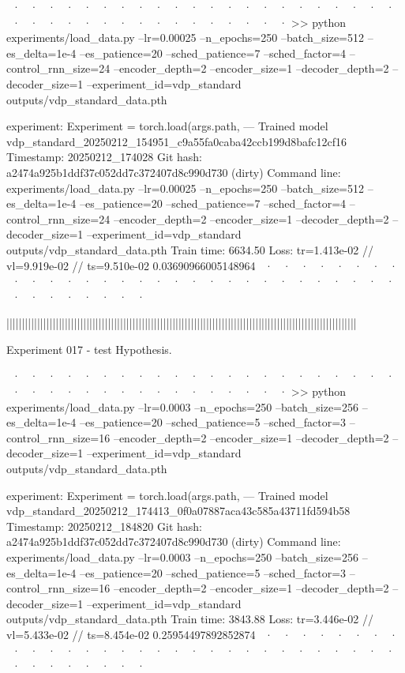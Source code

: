~· ~· ~· ~· ~· ~· ~· ~· ~· ~· ~· ~· ~· ~· ~· ~· ~· ~· ~· ~· ~· ~· ~· ~· ~· ~· ~· ~· ~· ~· ~· ~· ~· ~· ~· ~· ~· ~· 
>> python experiments/load_data.py --lr=0.00025 --n_epochs=250 --batch_size=512 --es_delta=1e-4 --es_patience=20 --sched_patience=7 --sched_factor=4 --control_rnn_size=24 --encoder_depth=2 --encoder_size=1 --decoder_depth=2 --decoder_size=1 --experiment_id=vdp_standard outputs/vdp_standard_data.pth

experiment: Experiment = torch.load(args.path,
--- Trained model   vdp_standard_20250212_154951_c9a55fa0caba42ccb199d8bafc12cf16
Timestamp:      20250212_174028
Git hash:       a2474a925b1ddf37c052dd7c372407d8c990d730 (dirty)
Command line:   experiments/load_data.py --lr=0.00025 --n_epochs=250 --batch_size=512 --es_delta=1e-4 --es_patience=20 --sched_patience=7 --sched_factor=4 --control_rnn_size=24 --encoder_depth=2 --encoder_size=1 --decoder_depth=2 --decoder_size=1 --experiment_id=vdp_standard outputs/vdp_standard_data.pth
Train time:     6634.50
Loss:           tr=1.413e-02 // vl=9.919e-02 // ts=9.510e-02
0.03690966005148964
~· ~· ~· ~· ~· ~· ~· ~· ~· ~· ~· ~· ~· ~· ~· ~· ~· ~· ~· ~· ~· ~· ~· ~· ~· ~· ~· ~· ~· ~· ~· ~· ~· ~· ~· ~· ~· ~· 



||||||||||||||||||||||||||||||||||||||||||||||||||||||||||||||||||||||||||||||||||||||||||||||||||||||||||||||||||


Experiment 017 - test Hypothesis. 


~· ~· ~· ~· ~· ~· ~· ~· ~· ~· ~· ~· ~· ~· ~· ~· ~· ~· ~· ~· ~· ~· ~· ~· ~· ~· ~· ~· ~· ~· ~· ~· ~· ~· ~· ~· ~· ~· 
>> python experiments/load_data.py --lr=0.0003 --n_epochs=250 --batch_size=256 --es_delta=1e-4 --es_patience=20 --sched_patience=5 --sched_factor=3 --control_rnn_size=16 --encoder_depth=2 --encoder_size=1 --decoder_depth=2 --decoder_size=1 --experiment_id=vdp_standard outputs/vdp_standard_data.pth 

experiment: Experiment = torch.load(args.path,
--- Trained model   vdp_standard_20250212_174413_0f0a07887aca43c585a43711fd594b58
Timestamp:      20250212_184820
Git hash:       a2474a925b1ddf37c052dd7c372407d8c990d730 (dirty)
Command line:   experiments/load_data.py --lr=0.0003 --n_epochs=250 --batch_size=256 --es_delta=1e-4 --es_patience=20 --sched_patience=5 --sched_factor=3 --control_rnn_size=16 --encoder_depth=2 --encoder_size=1 --decoder_depth=2 --decoder_size=1 --experiment_id=vdp_standard outputs/vdp_standard_data.pth
Train time:     3843.88
Loss:           tr=3.446e-02 // vl=5.433e-02 // ts=8.454e-02
0.25954497892852874
~· ~· ~· ~· ~· ~· ~· ~· ~· ~· ~· ~· ~· ~· ~· ~· ~· ~· ~· ~· ~· ~· ~· ~· ~· ~· ~· ~· ~· ~· ~· ~· ~· ~· ~· ~· ~· ~· 




